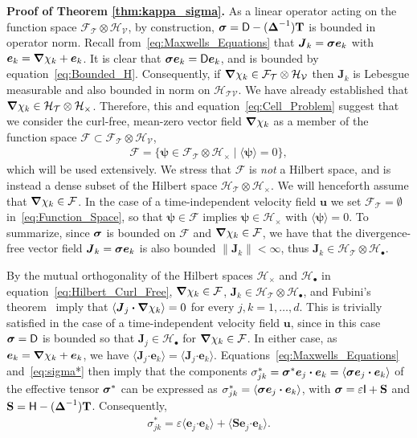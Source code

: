 \documentclass[leqno,onefignum,onetabnum]{siamltex1213}
\newcommand{\Tb}{\mathbf{T}}
\newcommand{\Sb}{\mathbf{S}}
\newcommand{\Tc}{\mathcal{T}}
\newcommand{\Vc}{\mathcal{V}}
\newcommand{\Hc}{\mathcal{H}}
\newcommand{\Fc}{\mathcal{F}}
\newcommand{\Dm}{\mathsf{D}}
\newcommand{\Hm}{\mathsf{H}}
\newcommand{\Ib}{\mathsf{I}}
\newcommand\bsig{\mbox{\boldmath${\sigma}$}}
\newcommand\bDelta{\mbox{\boldmath${\Delta}$}}
\newcommand\bnabla{\mbox{\boldmath${\nabla}$}}
\providecommand\bcdot{\boldsymbol{\cdot}}
\newcommand{\vecJ}{\boldsymbol{J}}
\newcommand{\vecu}{\boldsymbol{u}}
\newcommand{\vece}{\boldsymbol{e}}
\newcommand{\vecpsi}{\boldsymbol{\psi}}
\begin{document}
\textbf{Proof of Theorem \ref{thm:kappa_sigma}.}\hspace{1ex}
%
As a linear operator acting on the function space
$\Fc_{\Tc}\otimes\Hc_{\Vc}$, by construction,
$\bsig=\Dm-(\bDelta^{-1})\Tb$ is bounded in operator norm. Recall
from~\eqref{eq:Maxwells_Equations} that $\vecJ_k=\bsig\vece _k$
with $\vece _k=\bnabla \chi_k+\vece _k$. It is clear that
$\bsig\vece _k=\Dm\vece _k$, and is bounded by
equation~\eqref{eq:Bounded_H}. Consequently, if 
$\bnabla \chi_k\in\Fc_{\Tc}\otimes\Hc_{\Vc}$ then  
$\vecJ_k$ is Lebesgue measurable and also bounded in norm on 
$\Hc_{\Tc\Vc}$. We have already established that 
$\bnabla \chi_k\in\Hc_{\Tc}\otimes\Hc_\times$. Therefore, this and
equation~\eqref{eq:Cell_Problem} suggest that we consider the
curl-free, 
mean-zero vector field $\bnabla \chi_k$ as a member of the function space
$\Fc\subset\Fc_{\Tc}\otimes\Hc_{\Vc}$,         
%
\begin{align}\label{eq:Function_Space}
  \Fc=\{\vecpsi\in\Fc_{\Tc}\otimes\Hc_\times \;|\; \langle\vecpsi\rangle=0\},  
\end{align}
%
which will be used extensively. We
stress that $\Fc$ is \emph{not} a Hilbert space, and is instead a
dense subset of the Hilbert space $\Hc_{\Tc}\otimes\Hc_\times$. We will
henceforth assume that $\bnabla \chi_k\in\Fc$. In the case of a
time-independent velocity field $\vecu $ we set $\Fc_{\Tc}=\emptyset$
in~\eqref{eq:Function_Space}, so that $\vecpsi\in\Fc$ implies  
$\vecpsi\in\Hc_\times$ with $\langle\vecpsi\rangle=0$. To summarize, since $\bsig$ is
bounded on $\Fc$ and $\bnabla \chi_k\in\Fc$, we have that the
divergence-free vector field $\vecJ_k=\bsig\vece _k$ is also
bounded $\|\vecJ_k\|<\infty$, thus $\vecJ_k\in\Hc_{\Tc}\otimes\Hc_\bullet$.  






By the mutual orthogonality of the Hilbert spaces $\Hc_\times$ and $\Hc_\bullet$
in equation~\eqref{eq:Hilbert_Curl_Free}, 
$\bnabla \chi_k\in\Fc$, $\vecJ_k\in\Hc_{\Tc}\otimes\Hc_\bullet$, and Fubini's
theorem~\cite{Folland:99} imply that $\langle\vecJ_j\bcdot\bnabla \chi_k\rangle=0$
for every 
$j,k=1,\ldots,d$. This is trivially 
satisfied in the case of a time-independent velocity field $\vecu $,
since in this case $\bsig=\Dm$ is bounded so that
$\vecJ_j\in\Hc_\bullet$ for $\bnabla \chi_k\in\Fc$. In either case, as
$\vece _k=\bnabla \chi_k+\vece _k$, we have
$\langle\vecJ_j\bcdot\vece _k\rangle=\langle\vecJ_j\bcdot\vece
_k\rangle$. Equations~\eqref{eq:Maxwells_Equations} and~\eqref{eq:sigma*}
then imply that 
the components
$\sigma^*_{jk}=\bsig^*\vece _j\bcdot\vece _k=\langle\bsig\vece _j\bcdot\vece _k\rangle$ of 
the effective tensor $\bsig^*$ can be expressed as
$\sigma^*_{jk}=\langle\bsig\vece _j\bcdot\vece _k\rangle$, with $\bsig=\varepsilon\Ib+\Sb$ and
$\Sb=\Hm-(\bDelta^{-1})\Tb$. Consequently,      
%
\begin{align}\label{eq:Reduction}
  \sigma^*_{jk} %
       =\varepsilon\langle\vece _j\bcdot\vece _k\rangle+\langle\Sb\vece _j\bcdot\vece _k\rangle.      
\end{align}
%
\end{document}
